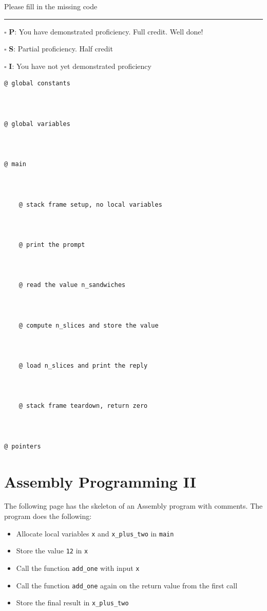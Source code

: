 \documentclass[12pt]{article}
\begin{document}
Please fill in the missing code

\vfill

\rule[1ex]{\textwidth}{.1pt}

$\square$ \textbf{P}: You have demonstrated proficiency. Full credit. Well done!

$\square$ \textbf{S}: Partial proficiency. Half credit

$\square$ \textbf{I}: You have not yet demonstrated proficiency

\newpage

\begin{verbatim}
@ global constants



@ global variables



@ main


    
    @ stack frame setup, no local variables



    @ print the prompt



    @ read the value n_sandwiches



    @ compute n_slices and store the value



    @ load n_slices and print the reply



    @ stack frame teardown, return zero



@ pointers
\end{verbatim}



\section*{Assembly Programming II}

The following page has the skeleton of an Assembly program with comments. The program does the following:
\begin{itemize}
    \item Allocate local variables \texttt{x} and \texttt{x\_plus\_two} in \texttt{main}
    \item Store the value \texttt{12} in \texttt{x}
    \item Call the function \texttt{add\_one} with input \texttt{x}
    \item Call the function \texttt{add\_one} again on the return value from the first call
    \item Store the final result in \texttt{x\_plus\_two}
\end{itemize}
\end{document}
